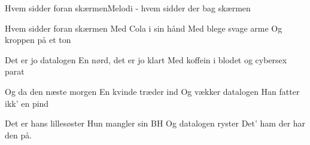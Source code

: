 \begin{sang}{Hvem sidder foran skærmen}{Melodi - hvem sidder der bag skærmen}
\begin{vers}
Hvem sidder foran skærmen
Med Cola i sin hånd
Med blege svage arme
Og kroppen på et ton
\end{vers}
\begin{vers}
Det er jo datalogen
En nørd, det er jo klart
Med koffein i blodet
og cybersex parat
\end{vers}
\vbox{}\vfill
\begin{vers}
Og da den næste morgen
En kvinde træder ind 
Og vækker datalogen
Han fatter ikk' en pind
\end{vers}
\begin{vers}
Det er hans lillesøster
Hun mangler sin BH
Og datalogen ryster
Det' ham der har den på.
\end{vers}
\laps
\end{sang}
